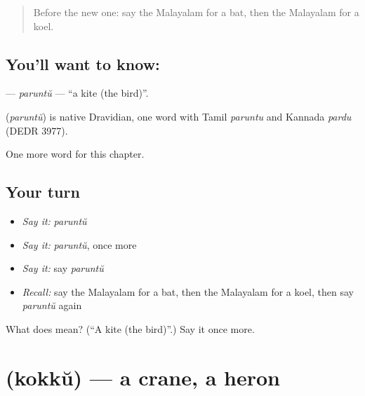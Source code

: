 \label{lesson:ML-C213-paruntu}



\begin{quote}
Before the new one: say the Malayalam for a bat, then the Malayalam for a koel.
\end{quote}

\subsection*{You'll want to know: }
\textbf{} — \emph{paruntŭ} — \textquotedblleft{}a kite (the bird)\textquotedblright{}.

\begin{cousinweb}
\textbf{} (\emph{paruntŭ}) is native Dravidian, one word with Tamil \emph{paruntu} and Kannada \emph{pardu} (DEDR 3977).
\end{cousinweb}

\begin{grammarlens}[title={What you've built}]
One more word for this chapter.
\end{grammarlens}

\subsection*{Your turn}
\begin{itemize}
\raggedright
  \item \emph{Say it:} \emph{paruntŭ}
  \item \emph{Say it:} \emph{paruntŭ}, once more
  \item \emph{Say it:} say \emph{paruntŭ}
  \item \emph{Recall:} say the Malayalam for a bat, then the Malayalam for a koel, then say \emph{paruntŭ} again
\end{itemize}

\begin{tcolorbox}[breakable,colback=teal!4,colframe=teal!35!black,title={Before you move on}]
What does  mean? (\textquotedblleft{}A kite (the bird)\textquotedblright{}.) Say it once more.
\end{tcolorbox}
\section[\texorpdfstring{\ml{കൊക്ക്} (kokkŭ)}{കൊക്ക് (kokkŭ)}]{ (kokkŭ) — a crane, a heron}

\label{lesson:ML-C213-kokku}



